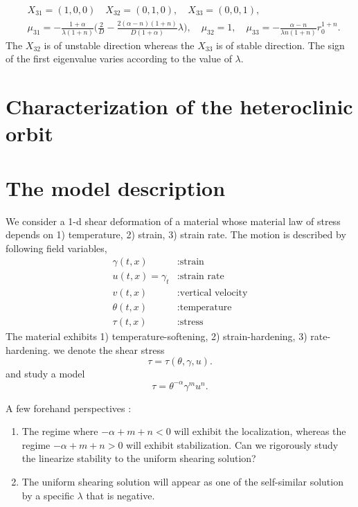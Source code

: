 \documentclass[a4paper,11pt]{article}
\def\blue{\color{blue}}
\begin{document}
\begin{align*}
 &X_{31} = (1,0,0) \quad X_{32}=(0,1,0), \quad X_{33}=(0,0,1),\\
 &\mu_{31} =-\frac{1+\alpha}{\lambda(1+n)} \Big(\frac{2}{D} - \frac{2(\alpha-n)(1+n)}{D(1+\alpha)}\lambda\Big), \quad \mu_{32}=1, \quad \mu_{33} = -\frac{\alpha-n}{\lambda n(1+n)}r_0^{1+n}.
\end{align*}
The $X_{32}$ is of unstable direction whereas the $X_{33}$ is of stable direction. The sign of the first eigenvalue varies according to the value of $\lambda$.

\section{Characterization of the heteroclinic orbit}








\section{The model description}
We consider a 1-d shear deformation of a material whose material law of stress depends on 1) temperature, 2) strain, 3) strain rate. The motion is described by following field variables,
\begin{equation} \label{eq:vars}
\begin{aligned}
 \gamma(t,x) &: \text{strain}\\
 u(t,x)=\gamma_t &: \text{strain rate}\\
 v(t,x) &: \text{vertical velocity}\\
 \theta(t,x) &: \text{temperature}\\
 \tau(t,x) &: \text{stress}
\end{aligned}
\end{equation}
The material exhibits 1) temperature-softening, 2) strain-hardening, 3) rate-hardening. we denote the shear stress
$$ \tau = \tau(\theta,\gamma,u). $$
and study a model
\begin{equation}
 \tau = \theta^{-\alpha}\gamma^m u^n. \label{eq:stresslaw}
\end{equation}

A few forehand perspectives :
\begin{enumerate}
 \item The regime where $-\alpha+m+n <0$ will exhibit the localization, whereas the regime $-\alpha+m+n > 0$ will exhibit stabilization. {\blue Can we rigorously study the linearize stability to the uniform shearing solution?}
 \item The uniform shearing solution will appear as one of the self-similar solution by a specific $\lambda$ that is negative.
\end{enumerate}
\end{document}
